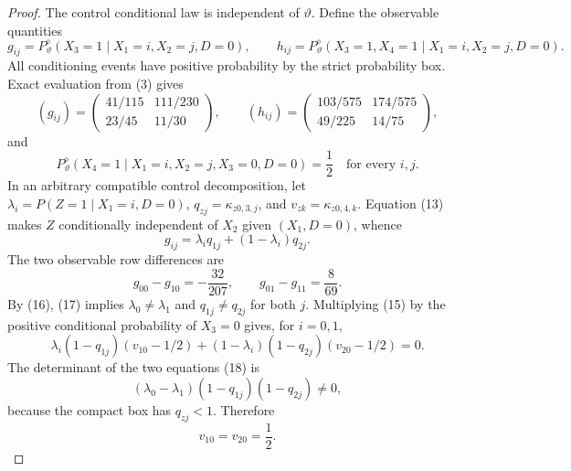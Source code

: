 \documentclass{article}
\begin{document}
\begin{proof}
The control conditional law is independent of \(\vartheta\). Define the observable quantities
\[
 g_{ij}=P^{\diamond}_{\vartheta}(X_3=1\mid X_1=i,X_2=j,D=0),
 \qquad
 h_{ij}=P^{\diamond}_{\vartheta}(X_3=1,X_4=1\mid X_1=i,X_2=j,D=0).
\]
All conditioning events have positive probability by the strict probability box. Exact evaluation from (3) gives
\[
 (g_{ij})=
 \begin{pmatrix}41/115&111/230\\[2pt]23/45&11/30\end{pmatrix},
 \qquad
 (h_{ij})=
 \begin{pmatrix}103/575&174/575\\[2pt]49/225&14/75\end{pmatrix},
 \tag{14}
\]
and
\[
 P^{\diamond}_{\vartheta}(X_4=1\mid X_1=i,X_2=j,X_3=0,D=0)=\frac12
 \quad\text{for every }i,j.
 \tag{15}
\]
In an arbitrary compatible control decomposition, let \(\lambda_i=P(Z=1\mid X_1=i,D=0)\), \(q_{zj}=\kappa_{z0,3,j}\), and \(v_{zk}=\kappa_{z0,4,k}\). Equation (13) makes \(Z\) conditionally independent of \(X_2\) given \((X_1,D=0)\), whence
\[
 g_{ij}=\lambda_iq_{1j}+(1-\lambda_i)q_{2j}.
 \tag{16}
\]
The two observable row differences are
\[
 g_{00}-g_{10}=-\frac{32}{207},
 \qquad g_{01}-g_{11}=\frac8{69}.
 \tag{17}
\]
By (16), (17) implies \(\lambda_0\ne\lambda_1\) and \(q_{1j}\ne q_{2j}\) for both \(j\). Multiplying (15) by the positive conditional probability of \(X_3=0\) gives, for \(i=0,1\),
\[
 \lambda_i(1-q_{1j})(v_{10}-1/2)
 +(1-\lambda_i)(1-q_{2j})(v_{20}-1/2)=0.
 \tag{18}
\]
The determinant of the two equations (18) is
\[
 (\lambda_0-\lambda_1)(1-q_{1j})(1-q_{2j})\ne0,
\]
because the compact box has \(q_{zj}<1\). Therefore
\[
 v_{10}=v_{20}=\frac12.
 \tag{19}
\]


\end{proof}
\end{document}
